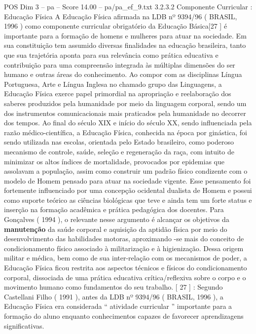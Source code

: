 \begin{textsample}{POS Dim 3 – pa – Score 14.00 – pa/pa\_ef\_9.txt}  \label{ex:f3_pos_236}
3.2.3.2 Componente Curricular : Educação Física A Educação Física afirmada na LDB nº 9394/96 ( BRASIL, 1996 ) como componente curricular obrigatório da Educação Básica[27 ] é importante para a formação de homens e mulheres para atuar na sociedade.
Em sua constituição tem assumido diversas finalidades na educação brasileira, tanto que sua trajetória aponta para sua relevância como prática educativa e contribuição para uma compreensão integrada às múltiplas dimensões do ser humano e outras áreas do conhecimento.
Ao compor com as disciplinas Língua Portuguesa, Arte e Língua Inglesa no chamado grupo das Linguagens, a Educação Física exerce papel primordial na apropriação e reelaboração dos saberes produzidos pela humanidade por meio da linguagem corporal, sendo um dos instrumentos comunicacionais mais praticados pela humanidade no decorrer dos tempos.
Ao final do século XIX e início do século XX, sendo influenciada pela razão médico-científica, a Educação Física, conhecida na época por ginástica, foi sendo utilizada nas escolas, orientada pelo Estado brasileiro, como poderoso mecanismo de controle, saúde, seleção e regeneração da raça, com intuito de minimizar os altos índices de mortalidade, provocados por epidemias que assolavam a população, assim como construir um padrão físico condizente com o modelo de Homem pensado para atuar na sociedade vigente.
Esse pensamento foi fortemente influenciado por uma concepção ocidental dualista de Homem e possui como suporte teórico as ciências biológicas que teve e ainda tem um forte status e inserção na formação acadêmica e prática pedagógica dos docentes.
Para Gonçalves ( 1994 ), o relevante nesse argumento é alcançar os objetivos da \textbf{manutenção} da saúde corporal e aquisição da aptidão física por meio do desenvolvimento das habilidades motoras, aproximando -se mais do conceito de condicionamento físico associado à militarização e à higienização.
Dessa origem militar e médica, bem como de sua inter-relação com os mecanismos de poder, a Educação Física ficou restrita aos aspectos técnicos e físicos do condicionamento corporal, dissociada de uma prática educativa crítica/reflexiva sobre o corpo e o movimento humano como fundamentos do seu trabalho. [ 27 ] : Segundo Castellani Filho ( 1991 ), antes da LDB nº 9394/96 ( BRASIL, 1996 ), a Educação Física era considerada “ atividade curricular ” importante para a formação do aluno enquanto conhecimentos capazes de favorecer aprendizagens significativas.

\end{textsample}
